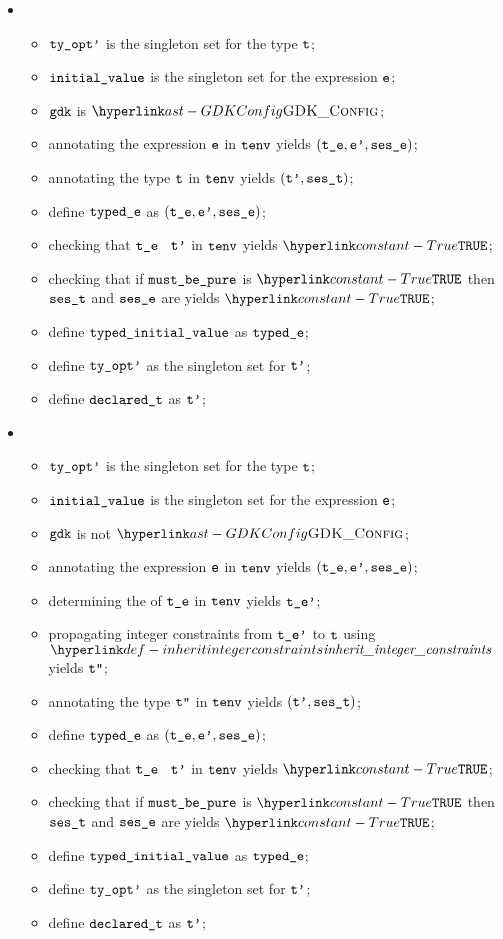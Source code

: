 \ProseParagraph
\OneApplies
\begin{itemize}
  \item {}
  \begin{itemize}
    \item $\texttt{ty\_opt'}$ is the singleton set for the type $\texttt{t}$;
    \item $\texttt{initial\_value}$ is the singleton set for the expression $\texttt{e}$;
    \item $\texttt{gdk}$ is $\GDKConfig$;
    \item annotating the expression $\texttt{e}$ in $\texttt{tenv}$ yields $(\texttt{t\_e}, \texttt{e'}, \texttt{ses\_e})$\ProseOrTypeError;
    \item annotating the type $\texttt{t}$ in $\texttt{tenv}$ yields $(\texttt{t'}, \texttt{ses\_t})$\ProseOrTypeError;
    \item define $\texttt{typed\_e}$ as $(\texttt{t\_e}, \texttt{e'}, \texttt{ses\_e})$;
    \item checking that $\texttt{t\_e}$ \typesatisfiesterm\ $\texttt{t'}$ in $\texttt{tenv}$ yields $\True$\ProseOrTypeError;
    \item checking that if $\texttt{must\_be\_pure}$ is $\True$ then $\texttt{ses\_t}$ and $\texttt{ses\_e}$ are \pureterm{} yields $\True$\ProseOrTypeError;
    \item define $\texttt{typed\_initial\_value}$ as $\texttt{typed\_e}$;
    \item define $\texttt{ty\_opt'}$ as the singleton set for $\texttt{t'}$;
    \item define $\texttt{declared\_t}$ as $\texttt{t'}$;
  \end{itemize}

  \item {}
  \begin{itemize}
    \item $\texttt{ty\_opt'}$ is the singleton set for the type $\texttt{t}$;
    \item $\texttt{initial\_value}$ is the singleton set for the expression $\texttt{e}$;
    \item $\texttt{gdk}$ is not $\GDKConfig$;
    \item annotating the expression $\texttt{e}$ in $\texttt{tenv}$ yields $(\texttt{t\_e}, \texttt{e'}, \texttt{ses\_e})$\ProseOrTypeError;
    \item determining the \structureterm{} of $\texttt{t\_e}$ in $\texttt{tenv}$ yields $\texttt{t\_e'}$\ProseOrTypeError;
    \item propagating integer constraints from $\texttt{t\_e'}$ to $\texttt{t}$ using $\inheritintegerconstraints$ yields $\texttt{t''}$\ProseOrTypeError;
    \item annotating the type $\texttt{t''}$ in $\texttt{tenv}$ yields $(\texttt{t'}, \texttt{ses\_t})$\ProseOrTypeError;
    \item define $\texttt{typed\_e}$ as $(\texttt{t\_e}, \texttt{e'}, \texttt{ses\_e})$;
    \item checking that $\texttt{t\_e}$ \typesatisfiesterm\ $\texttt{t'}$ in $\texttt{tenv}$ yields $\True$\ProseOrTypeError;
    \item checking that if $\texttt{must\_be\_pure}$ is $\True$ then $\texttt{ses\_t}$ and $\texttt{ses\_e}$ are \pureterm{} yields $\True$\ProseOrTypeError;
    \item define $\texttt{typed\_initial\_value}$ as $\texttt{typed\_e}$;
    \item define $\texttt{ty\_opt'}$ as the singleton set for $\texttt{t'}$;
    \item define $\texttt{declared\_t}$ as $\texttt{t'}$;
  \end{itemize}


\end{itemize}
